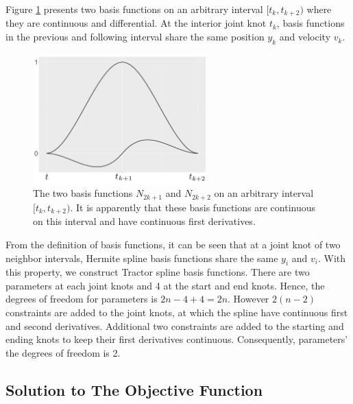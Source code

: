 Figure \ref{basisfigure} presents two basis functions on an arbitrary interval $[t_k, t_{k+2} )$ where they are continuous and differential. At the interior joint knot $t_k$, basis functions in the previous and following interval share the same position $y_k$ and velocity $v_k$. 
\begin{figure}[h] 
\centering
\includegraphics[width=0.6\textwidth, height=5cm]{Chapters/02TractorSplineTheory/plot/pptbasisplot}
\caption{The two basis functions $N_{2k+1}$ and $N_{2k+2}$ on an arbitrary interval $[t_k, t_{k+2})$. It is apparently that these basis functions are continuous on this interval and have continuous first derivatives.}
\label{basisfigure}
\end{figure}


From the definition of basis functions, it can be seen that at a joint knot of two neighbor intervals, Hermite spline basis functions share the same $y_i$ and $v_i$. With this property, we construct Tractor spline basis functions. There are two parameters at each joint knots and 4 at the start and end knots. Hence, the degrees of freedom for parameters is $2n-4+4=2n$. However $2(n-2)$ constraints are added to the joint knots, at which the spline have continuous first and second derivatives. Additional two constraints are added to the starting and ending knots to keep their first derivatives continuous. Consequently, parameters' the degrees of freedom is 2. 


\subsection{Solution to The Objective Function}

